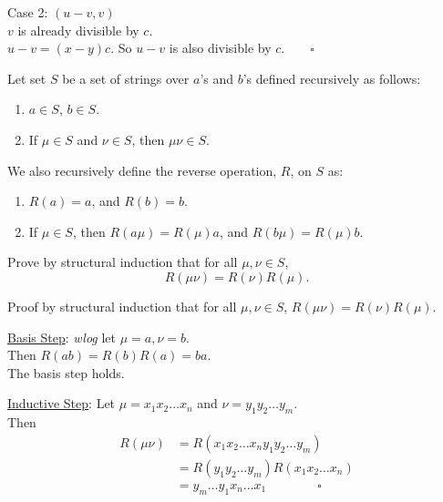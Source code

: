 \documentclass[a4paper]{exam}
\begin{document}
\begin{questions}
\begin{solution}
    Case 2: $(u-v, v)$\\
    $v$ is already divisible by $c$.\\
    $u-v = (x-y)c$. So $u-v$ is also divisible by $c.\qquad\square$
  \end{solution}

  
\question
  Let set $S$ be a set of strings over $a$'s and $b$'s defined recursively as follows:
  \begin{enumerate}
  \item $a \in S$, $b \in S$.
  \item If $\mu \in S$ and $\nu \in S$, then $\mu\nu \in S$.
  \end{enumerate}
  We also recursively define the reverse operation, $R$, on $S$ as:
  \begin{enumerate}
  \item $R(a) = a$, and $R(b) = b$.
  \item If $\mu \in S$, then $R(a\mu) = R(\mu)a$, and $R(b\mu) = R(\mu)b$.
  \end{enumerate}
  Prove by structural induction that for all $\mu, \nu \in S$,
  \[ R(\mu\nu) = R(\nu)R(\mu). \]

  \begin{solution}
    Proof by structural induction that for all $\mu, \nu \in S$,  $ R(\mu\nu) = R(\nu)R(\mu).$

    \underline{Basis Step}: \textit{wlog} let $\mu=a, \nu=b$.\\
    Then $R(ab) = R(b)R(a) = ba$.\\
    The basis step holds.

    \underline{Inductive Step}: Let $\mu=x_1x_2\ldots x_n$ and $\nu=y_1y_2\ldots y_m$.\\
    Then
    \begin{align*}
      R(\mu\nu) &= R(x_1x_2\ldots x_ny_1y_2\ldots y_m)\\
                & = R(y_1y_2\ldots y_m)R(x_1x_2\ldots x_n)\\
                & =y_m\ldots y_1x_n\ldots x_1 \qquad\qquad\square
    \end{align*}
  \end{solution}
  
\end{questions}
\end{document}
